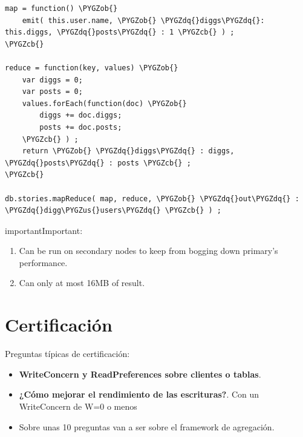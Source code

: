 \documentclass[a4paper,10pt,english]{sphinxmanual}
\def\PYGZus{\char`\_}
\def\PYGZob{\char`\{}
\def\PYGZcb{\char`\}}
\def\PYGZdq{\char`\"}
\begin{document}
\begin{Verbatim}[commandchars=\\\{\}]
map = function() \PYGZob{}
    emit( this.user.name, \PYGZob{} \PYGZdq{}diggs\PYGZdq{}: this.diggs, \PYGZdq{}posts\PYGZdq{} : 1 \PYGZcb{} ) ;
\PYGZcb{}

reduce = function(key, values) \PYGZob{}
    var diggs = 0;
    var posts = 0;
    values.forEach(function(doc) \PYGZob{}
        diggs += doc.diggs;
        posts += doc.posts;
    \PYGZcb{} ) ;
    return \PYGZob{} \PYGZdq{}diggs\PYGZdq{} : diggs, \PYGZdq{}posts\PYGZdq{} : posts \PYGZcb{} ;
\PYGZcb{}

db.stories.mapReduce( map, reduce, \PYGZob{} \PYGZdq{}out\PYGZdq{} : \PYGZdq{}digg\PYGZus{}users\PYGZdq{} \PYGZcb{} ) ;
\end{Verbatim}

\begin{notice}{important}{Important:}\begin{enumerate}
\item {} 
Can be run on secondary nodes to keep from bogging down primary’s performance.

\item {} 
Can only at most 16MB of result.

\end{enumerate}
\end{notice}


\chapter{Certificación}
\label{contents/certificacion::doc}\label{contents/certificacion:certificacion}
Preguntas típicas de certificación:
\begin{itemize}
\item {} 
\textbf{WriteConcern y ReadPreferences sobre clientes o tablas}.

\item {} 
\textbf{¿Cómo mejorar el rendimiento de las escrituras?}. Con un WriteConcern de W=0 o menos

\item {} 
Sobre unas 10 preguntas van a ser sobre el framework de agregación.

\end{itemize}
\end{document}
